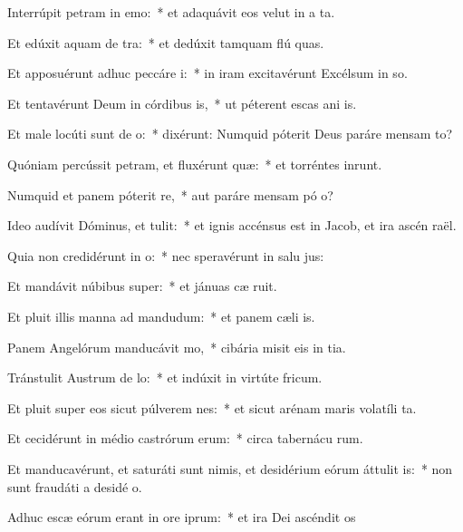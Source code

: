\item Interrúpit petram in emo:~* et adaquávit eos velut in a ta.
\item Et edúxit aquam de tra:~* et dedúxit tamquam flú quas.
\item Et apposuérunt adhuc peccáre i:~* in iram excitavérunt Excélsum in so.
\item Et tentavérunt Deum in córdibus is,~* ut péterent escas ani is.
\item Et male locúti sunt de o:~* dixérunt: Numquid póterit Deus paráre mensam  to?
\item Quóniam percússit petram, et fluxérunt quæ:~* et torréntes inrunt.
\item Numquid et panem póterit re,~* aut paráre mensam pó o?
\item Ideo audívit Dóminus, et tulit:~* et ignis accénsus est in Jacob, et ira ascén  raël.
\item Quia non credidérunt in o:~* nec speravérunt in salu jus:
\item Et mandávit núbibus super:~* et jánuas cæ ruit.
\item Et pluit illis manna ad mandudum:~* et panem cæli  is.
\item Panem Angelórum manducávit mo,~* cibária misit eis in tia.
\item Tránstulit Austrum de lo:~* et indúxit in virtúte  fricum.
\item Et pluit super eos sicut púlverem nes:~* et sicut arénam maris volatíli ta.
\item Et cecidérunt in médio castrórum erum:~* circa tabernácu rum.
\item Et manducavérunt, et saturáti sunt nimis, et desidérium eórum áttulit is:~* non sunt fraudáti a desidé o.
\item Adhuc escæ eórum erant in ore iprum:~* et ira Dei ascéndit  os
